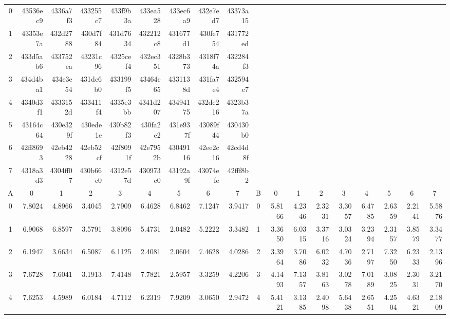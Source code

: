 \documentclass{article}
\begin{document}
\begin{adjustbox}{angle=90}
{\begin{tabular}{|c|rrrrrrrr|c|rrrrrrrr|}
0 & 43536ec9 & 4336a7f3 & 433255c7 & 433f9b3a & 433ea528 & 433ec6a9 & 432e7ed7 & 43373a15 &  &  &  &  &  &  &  &  &  \\
1 & 43353e7a & 432d2788 & 430d7f84 & 431d7634 & 432212c8 & 431677d1 & 430fe754 & 431772ed &  &  &  &  &  &  &  &  &  \\
2 & 433d5ab6 & 433752ea & 43231c96 & 4325cef4 & 432ec351 & 4328b373 & 4318f74a & 432284f3 &  &  &  &  &  &  &  &  &  \\
3 & 434d4ba1 & 434e3e54 & 431dc6b0 & 433199f5 & 43464c65 & 4331138d & 431fa7e4 & 432594c7 &  &  &  &  &  &  &  &  &  \\
4 & 4340d3f1 & 4333152d & 433411f4 & 4335e3bb & 4341d207 & 43494175 & 432de216 & 4323b37a &  &  &  &  &  &  &  &  &  \\
5 & 43164c64 & 430e329f & 430ede1e & 430b82f3 & 430fa2e2 & 431e937f & 43089f44 & 430430b0 &  &  &  &  &  &  &  &  &  \\
6 & 42ff8693 & 42eb4228 & 42eb52cf & 42f8091f & 42e7952b & 43049116 & 42ee2c16 & 42cd4d8f &  &  &  &  &  &  &  &  &  \\
7 & 4318a3d3 & 4304ff07 & 430b66c0 & 4312e57d & 430973c0 & 43192a9f & 43074efe & 42fff8b2 &  &  &  &  &  &  &  &  &  \\ \hline
A & \multicolumn{1}{c}{0} & \multicolumn{1}{c}{1} & \multicolumn{1}{c}{2} & \multicolumn{1}{c}{3} & \multicolumn{1}{c}{4} & \multicolumn{1}{c}{5} & \multicolumn{1}{c}{6} & \multicolumn{1}{c|}{7} & B & \multicolumn{1}{c}{0} & \multicolumn{1}{c}{1} & \multicolumn{1}{c}{2} & \multicolumn{1}{c}{3} & \multicolumn{1}{c}{4} & \multicolumn{1}{c}{5} & \multicolumn{1}{c}{6} & \multicolumn{1}{c|}{7} \\ \hline
0 & 7.8024 & 4.8966 & 3.4045 & 2.7909 & 6.4628 & 6.8462 & 7.1247 & 3.9417 & 0 & 5.8166 & 4.2346 & 2.3231 & 3.3057 & 6.4785 & 2.6359 & 2.2141 & 5.5876 \\
1 & 6.9068 & 6.8597 & 3.5791 & 3.8096 & 5.4731 & 2.0482 & 5.2222 & 3.3482 & 1 & 3.3650 & 6.0315 & 3.3716 & 3.0324 & 3.2394 & 2.3157 & 3.8579 & 3.3477 \\
2 & 6.1947 & 3.6634 & 6.5087 & 6.1125 & 2.4081 & 2.0604 & 7.4628 & 4.0286 & 2 & 3.3964 & 3.7086 & 6.0232 & 4.7036 & 2.7197 & 7.3250 & 6.2333 & 2.1396 \\
3 & 7.6728 & 7.6041 & 3.1913 & 7.4148 & 7.7821 & 2.5957 & 3.3259 & 4.2206 & 3 & 4.1493 & 7.1357 & 3.8163 & 3.0278 & 7.0189 & 3.0825 & 2.3031 & 3.2170 \\
4 & 7.6253 & 4.5989 & 6.0184 & 4.7112 & 6.2319 & 7.9209 & 3.0650 & 2.9472 & 4 & 5.4121 & 3.1385 & 2.4098 & 5.6438 & 2.6551 & 4.2504 & 4.6321 & 2.1809 \\

\end{tabular}}
\end{adjustbox}
\end{document}
